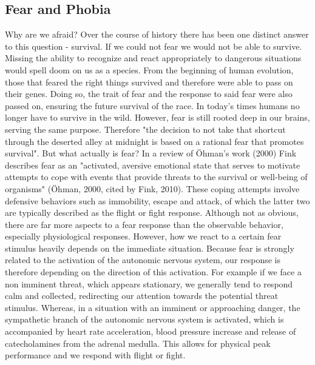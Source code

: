 \subsection{Fear and Phobia} 
Why are we afraid? Over the course of history there has been one distinct answer to this question - survival. If we could not fear we would not be able to survive. Missing the ability to recognize and react appropriately to dangerous situations would spell doom on us as a species. From the beginning of human evolution, those that feared the right things survived and therefore were able to pass on their genes. Doing so, the trait of fear and the response to said fear were also passed on, ensuring the future survival of the race. In today's times humans no longer have to survive in the wild. However, fear is still rooted deep in our brains, serving the same purpose. Therefore "the decision to not take that shortcut through the deserted alley at midnight is based on a rational fear that promotes survival"\cite{LAYTON}. But what actually is fear? In a review of Öhman's work (2000) Fink describes fear as an "activated, aversive emotional state that serves to motivate attempts to cope with events that provide threats to the survival or well-being of organisms" (Öhman, 2000, cited by Fink, 2010). These coping attempts involve defensive behaviors such as immobility, escape and attack, of which the latter two are typically described as the flight or fight response. Although not as obvious, there are far more aspects to a fear response than the observable behavior, especially physiological responses. However, how we react to a certain fear stimulus heavily depends on the immediate situation. Because fear is strongly related to the activation of the autonomic nervous system, our response is therefore depending on the direction of this activation. For example if we face a non imminent threat, which appears stationary, we generally tend to respond calm and collected, redirecting our attention towards the potential threat stimulus. Whereas, in a situation with an imminent or approaching danger, the sympathetic branch of the autonomic nervous system is activated, which is accompanied by heart rate acceleration, blood pressure increase and release of catecholamines from the adrenal medulla. This allows for physical peak performance and we respond with flight or fight. \\ 


